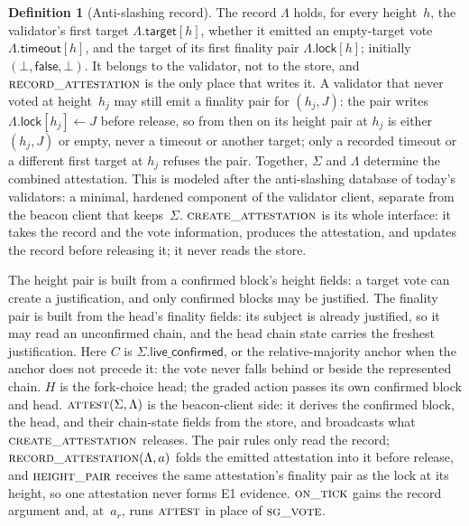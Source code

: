 \documentclass{article}
\theoremstyle{plain}
\theoremstyle{definition}
\newtheorem{definition}{Definition}
\theoremstyle{remark}
\newcommand{\liveConfirmed}{\mathsf{live\_confirmed}}
\begin{document}
\begin{definition}[Anti-slashing record]\label{def:antislashing}
The record $\Lambda$ holds, for every height~$h$, the validator's first
target $\Lambda.\mathsf{target}[h]$, whether it emitted an empty-target
vote $\Lambda.\mathsf{timeout}[h]$, and the target of its first finality
pair $\Lambda.\mathsf{lock}[h]$; initially
$(\bot,\mathsf{false},\bot)$.  It belongs to the validator, not to the store,
and $\Call{record\_attestation}{}$ is the only place that writes it. A validator that never voted at height~$h_j$ may still emit a finality pair for $(h_j,J)$: the pair writes $\Lambda.\mathsf{lock}[h_j]\gets J$ before release, so from then on its height pair at $h_j$ is either $(h_j,J)$ or empty, never a timeout or another target; only a recorded timeout or a different first target at $h_j$ refuses the pair.  Together,
$\Sigma$ and $\Lambda$ determine the combined attestation.  This is modeled
after the anti-slashing database of today's validators: a minimal, hardened
component of the validator client, separate from the beacon client that
keeps~$\Sigma$.  $\Call{create\_attestation}{}$ is its whole interface:
it takes the record and the vote information, produces the attestation,
and updates the record before releasing it; it never reads the store.
\end{definition}

The height pair is built from a confirmed block's height fields: a target
vote can create a justification, and
only confirmed blocks may be justified.  The finality pair is built from
the head's finality fields: its subject is
already justified, so it may read an unconfirmed chain, and the head
chain state carries the freshest justification.  Here $C$ is
$\Sigma.\liveConfirmed$, or the relative-majority anchor when the anchor
does not precede it: the vote never falls behind or beside the
represented chain.  $H$ is the fork-choice head; the
graded action passes its own confirmed block and head.
$\Call{attest}{\Sigma,\Lambda}$ is the beacon-client side: it derives
the confirmed block, the head, and their chain-state fields from the
store, and
broadcasts what $\Call{create\_attestation}{}$ releases.  The pair rules
only read the record; $\Call{record\_attestation}{\Lambda,a}$ folds the
emitted attestation into it before release, and
$\Call{height\_pair}{}$ receives the same attestation's finality pair as
the lock at its height, so one attestation never forms E1 evidence.
$\Call{on\_tick}{}$ gains the record argument and, at~$a_r$, runs
$\Call{attest}{}$ in place of $\Call{sg\_vote}{}$.
\end{document}
